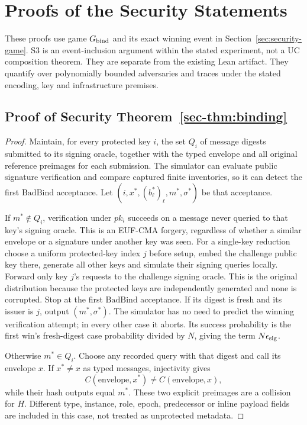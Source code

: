 \section{Proofs of the Security Statements}
\label{app:security-proofs}
These proofs use game $G_{\rm bind}$ and its exact winning event in
Section~\ref{sec:security-game}. S3 is an event-inclusion argument within
the stated experiment, not a UC composition theorem. They are separate from the existing Lean
artifact. They quantify over polynomially bounded adversaries and traces
under the stated encoding, key and infrastructure premises.

\subsection{Proof of Security Theorem~\ref{sec-thm:binding}}
\begin{proof}
Maintain, for every protected key $i$, the set $Q_i$ of message digests
submitted to its signing oracle, together with the typed envelope and all
original reference preimages for each submission. The simulator can
evaluate public signature verification and compare captured finite
inventories, so it can detect the first $\mathrm{BadBind}$ acceptance.
Let $(i,x^*,(b_\ell^*)_\ell,m^*,\sigma^*)$ be that acceptance.

If $m^*\notin Q_i$, verification under $pk_i$ succeeds on a message never
queried to that key's signing oracle. This is an EUF-CMA forgery, regardless
of whether a similar envelope or a signature under another key was seen.
For a single-key reduction choose a uniform protected-key index $j$ before
setup, embed the challenge public key there, generate all other keys and
simulate their signing queries locally. Forward only key $j$'s requests
to the challenge signing oracle. This is the original distribution because
the protected keys are independently generated and none is corrupted.
Stop at the first $\mathrm{BadBind}$ acceptance. If its digest is fresh
and its issuer is $j$, output
$(m^*,\sigma^*)$. The simulator has no need to predict the winning
verification attempt; in every other case it aborts. Its success probability
is the first win's fresh-digest case probability
divided by $N$, giving the term $N\epsilon_{\rm sig}$.

Otherwise $m^*\in Q_i$. Choose any recorded query with that digest and call
its envelope $x$. If $x^*\ne x$ as typed messages, injectivity gives
\[
 C(\mathrm{envelope},x^*)\ne C(\mathrm{envelope},x),
\]
while their hash outputs equal $m^*$. These two explicit preimages are
a collision for $H$. Different type, instance, role, epoch, predecessor
or inline payload fields are included in this case, not treated as
unprotected metadata.


\end{proof}
